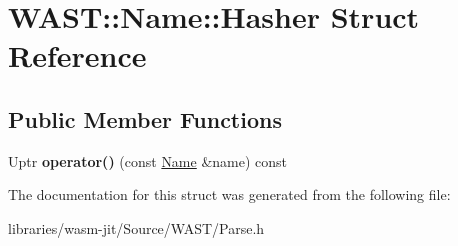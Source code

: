 \hypertarget{struct_w_a_s_t_1_1_name_1_1_hasher}{}\section{W\+A\+ST\+:\+:Name\+:\+:Hasher Struct Reference}
\label{struct_w_a_s_t_1_1_name_1_1_hasher}
\subsection*{Public Member Functions}
\begin{DoxyCompactItemize}
\item 
\mbox{\label{struct_w_a_s_t_1_1_name_1_1_hasher_a2c0b53171965c254db2f86057b65ef32}} 
Uptr {\bfseries operator()} (const \mbox{\hyperlink{struct_w_a_s_t_1_1_name}{Name}} \&name) const
\end{DoxyCompactItemize}


The documentation for this struct was generated from the following file\+:\begin{DoxyCompactItemize}
\item 
libraries/wasm-\/jit/\+Source/\+W\+A\+S\+T/Parse.\+h\end{DoxyCompactItemize}
